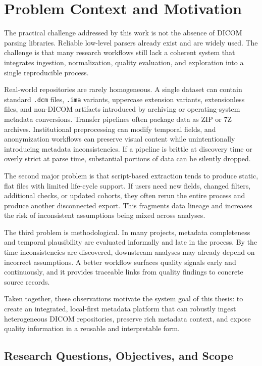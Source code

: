 \chapter{Problem Context and Motivation}
The practical challenge addressed by this work is not the absence of DICOM parsing libraries. Reliable low-level parsers already exist and are widely used. The challenge is that many research workflows still lack a coherent system that integrates ingestion, normalization, quality evaluation, and exploration into a single reproducible process.

Real-world repositories are rarely homogeneous. A single dataset can contain standard \texttt{.dcm} files, \texttt{.ima} variants, uppercase extension variants, extensionless files, and non-DICOM artifacts introduced by archiving or operating-system metadata conversions. Transfer pipelines often package data as ZIP or 7Z archives. Institutional preprocessing can modify temporal fields, and anonymization workflows can preserve visual content while unintentionally introducing metadata inconsistencies. If a pipeline is brittle at discovery time or overly strict at parse time, substantial portions of data can be silently dropped.

The second major problem is that script-based extraction tends to produce static, flat files with limited life-cycle support. If users need new fields, changed filters, additional checks, or updated cohorts, they often rerun the entire process and produce another disconnected export. This fragments data lineage and increases the risk of inconsistent assumptions being mixed across analyses. 

The third problem is methodological. In many projects, metadata completeness and temporal plausibility are evaluated informally and late in the process. By the time inconsistencies are discovered, downstream analyses may already depend on incorrect assumptions. A better workflow surfaces quality signals early and continuously, and it provides traceable links from quality findings to concrete source records.

Taken together, these observations motivate the system goal of this thesis: to create an integrated, local-first metadata platform that can robustly ingest heterogeneous DICOM repositories, preserve rich metadata context, and expose quality information in a reusable and interpretable form.

\section{Research Questions, Objectives, and Scope}

